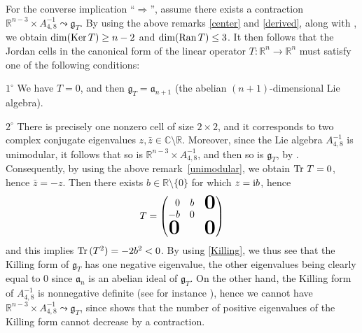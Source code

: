 \documentclass[
reqno]{amsart}
\begin{document}
\begin{itemize}
For the converse implication ``$\Rightarrow$'', assume there exists a contraction 
${{\mathbb R}}^{n-3}\times A_{4,8}^{-1}{\leadsto}{{\mathfrak g}}_T$. 
By using the above remarks \eqref{center} and \eqref{derived}, 
along with \cite[Th. 1((3)--(4))]{NP06}, 
we obtain $\dim({{\rm Ker}\,} T)\ge n-2$ and $\dim({{\rm Ran}\,} T)\le 3$. 
It then follows that the Jordan cells in the canonical form of the linear operator $T\colon{{\mathbb R}}^n\to{{\mathbb R}}^n$ 
must satisfy one of the following conditions: 

\smallbreak 

$1^\circ$ We have $T=0$, and then ${{\mathfrak g}}_T={{\mathfrak a}}_{n+1}$ (the abelian $(n+1)$-dimensional Lie algebra). 

\smallbreak 

$2^\circ$ There is precisely one nonzero cell of size $2\times 2$, and it corresponds to 
two complex conjugate eigenvalues $z,\bar z\in{{\mathbb C}}\setminus{{\mathbb R}}$. 
Moreover, since the Lie algebra $A_{4,8}^{-1}$ is unimodular, 
it follows that so is ${{\mathbb R}}^{n-3}\times A_{4,8}^{-1}$, 
and then so is ${{\mathfrak g}}_T$, by \cite[Th. 1(12)]{NP06}. 
Consequently, by using the above remark~\eqref{unimodular}, 
we obtain ${{\rm Tr}\,}\,T=0$, hence $\bar z=-z$. 
Then there exists $b\in{{\mathbb R}}\setminus\{0\}$ for which $z={{\rm i}} b$, hence 
\begin{equation}\label{Tb}
T=\begin{pmatrix}
\hfill 0  & b &             \raisebox{-3pt}{\text{\bf\huge 0}}\\
       -b & 0 &             \\
\hfill \text{\bf\huge 0}&   &     \text{\bf\huge 0}  
\end{pmatrix}
\end{equation}
and this implies ${{\rm Tr}\,}(T^2)=-2b^2<0$. 
By using \eqref{Killing}, 
we thus see that the Killing form of ${{\mathfrak g}}_T$ has one negative eigenvalue, 
the other eigenvalues being clearly equal to 0 since ${{\mathfrak a}}_n$ is an abelian ideal of ${{\mathfrak g}}_T$. 
On the other hand, the Killing form of $A_{4,8}^{-1}$ is nonnegative definite 
(see for instance \cite[\S VI.B]{NP06}), hence we cannot have ${{\mathbb R}}^{n-3}\times A_{4,8}^{-1}{\leadsto}{{\mathfrak g}}_T$, 
since \cite[Th. 1(16)]{NP06} 
shows that the number of positive eigenvalues of the Killing form cannot decrease 
by a contraction.  

\smallbreak 


\end{itemize}
\end{document}
